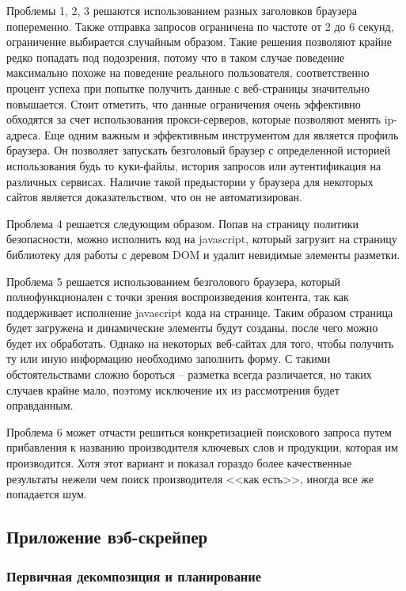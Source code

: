 \documentclass[../main]{subfiles}
\begin{document}
Проблемы 1, 2, 3 решаются использованием разных заголовков браузера попеременно. Также отправка запросов ограничена по частоте от 2 до 6 секунд, ограничение выбирается случайным образом. Такие решения позволяют крайне редко попадать под подозрения, потому что в таком случае поведение максимально похоже на поведение реального пользователя, соответственно процент успеха при попытке получить данные с веб-страницы значительно повышается. Стоит отметить, что данные ограничения очень эффективно обходятся за счет использования прокси-серверов, которые позволяют менять ip-адреса. Еще одним важным и эффективным инструментом для является профиль браузера. Он позволяет запускать безголовый браузер с определенной историей использования будь то куки-файлы, история запросов или аутентификация на различных сервисах. Наличие такой предыстории у браузера для некоторых сайтов является доказательством, что он не автоматизирован.

Проблема 4 решается следующим образом. Попав на страницу политики безопасности, можно исполнить код на javascript, который загрузит на страницу библиотеку для работы с деревом DOM и удалит невидимые элементы разметки.

Проблема 5 решается использованием безголового браузера, который полнофункционален с точки зрения воспроизведения контента, так как поддерживает исполнение javascript кода на странице. Таким образом страница будет загружена и динамические элементы будут созданы, после чего можно будет их обработать. Однако на некоторых веб-сайтах для того, чтобы получить ту или иную информацию необходимо заполнить форму. С такими обстоятельствами сложно бороться – разметка всегда различается, но таких случаев крайне мало, поэтому исключение их из рассмотрения будет оправданным.

Проблема 6 может отчасти решиться конкретизацией поискового запроса путем прибавления к названию производителя ключевых слов и продукции, которая им производится. Хотя этот вариант и показал гораздо более качественные результаты нежели чем поиск производителя <<как есть>>, иногда все же попадается шум.

\subsection{Приложение вэб-скрейпер}

\subsubsection{Первичная декомпозиция и планирование}
\end{document}
